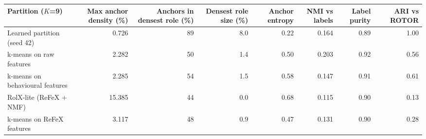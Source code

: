 \begin{tabular}{lrrrrrrr}
\toprule
\textbf{Partition ($K$=9)} & \textbf{Max anchor density (\%)} & \textbf{Anchors in densest role (\%)} & \textbf{Densest role size (\%)} & \textbf{Anchor entropy} & \textbf{NMI vs labels} & \textbf{Label purity} & \textbf{ARI vs ROTOR} \\
\midrule
Learned partition (seed 42) & 0.726 & 89 & 8.0 & 0.22 & 0.164 & 0.89 & 1.00 \\
k-means on raw features & 2.282 & 50 & 1.4 & 0.50 & 0.203 & 0.92 & 0.56 \\
k-means on behavioural features & 2.285 & 54 & 1.5 & 0.58 & 0.147 & 0.91 & 0.61 \\
RolX-lite (ReFeX + NMF) & 15.385 & 44 & 0.0 & 0.68 & 0.115 & 0.90 & 0.13 \\
k-means on ReFeX features & 3.117 & 48 & 0.9 & 0.47 & 0.131 & 0.90 & 0.28 \\
\bottomrule
\end{tabular}
